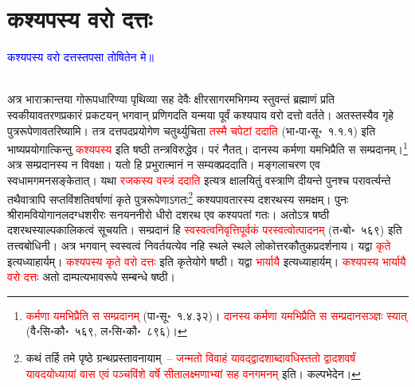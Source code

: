 \section[कश्यपस्य वरो दत्तः]{कश्यपस्य वरो दत्तः}
\centering\textcolor{blue}{कश्यपस्य वरो दत्तस्तपसा तोषितेन मे॥}\nopagebreak\\
\\
\begin{sloppypar}\justifying\noindent\hspace{10mm} अत्र भाराक्रान्तया गो\-रूप\-धारिण्या पृथिव्या सह देवैः क्षीर\-सागरमभिगम्य स्तुवन्तं ब्रह्माणं प्रति स्वकीयावतरण\-प्रकारं प्रकटयन् भगवान् प्रणिगदति यन्मया पूर्वं कश्यपाय वरो दत्तो वर्तते। अतस्तस्यैव गृहे पुत्र\-रूपेणावतरिष्यामि। तत्र दत्त\-पद\-प्रयोगेण चतुर्थ्युचिता \textcolor{red}{तस्मै चपेटां ददाति} (भा॰पा॰सू॰~१.१.१) इति भाष्य\-प्रयोगात्किन्तु \textcolor{red}{कश्यपस्य} इति षष्ठी तन्त्रविरुद्धेव। परं नैतत्। दानस्य कर्मणा यमभिप्रैति स सम्प्रदानम्।\footnote{\textcolor{red}{कर्मणा यमभिप्रैति स सम्प्रदानम्} (पा॰सू॰~१.४.३२)। \textcolor{red}{दानस्य कर्मणा यमभिप्रैति स सम्प्रदान\-सञ्ज्ञः स्यात्} (वै॰सि॰कौ॰~५६९, ल॰सि॰कौ॰~८९६)।} अत्र सम्प्रदानस्य न विवक्षा। यतो हि प्रभुरात्मानं न सम्यक्प्रददाति। मङ्गलाचरण एव स्व\-धाम\-गमन\-सङ्केतात्। यथा \textcolor{red}{रजकस्य वस्त्रं ददाति} इत्यत्र क्षालयितुं वस्त्राणि दीयन्ते पुनश्च परावर्त्यन्ते तथैवात्रापि सप्तविंशति\-वर्षाणां कृते पुत्र\-रूपेणाऽगतः\footnote{कथं तर्हि \pageref{text:exileage1}\-तमे पृष्ठे ग्रन्थ\-प्रस्तावनायाम्~– \textcolor{red}{जन्मतो विवाहं यावद्द्वादशाब्दावधिस्ततो द्वादश\-वर्षं यावदयोध्यायां वास एवं पञ्चविंशे वर्षे सीता\-लक्ष्मणाभ्यां सह वन\-गमनम्‌} इति। कल्पभेदेन।} कश्यपावतारस्य दशरथस्य समक्षम्। पुनः श्रीराम\-वियोगानल\-दग्ध\-शरीरः सनयन\-नीरो धीरो दशरथ एव कश्यपतां गतः। अतोऽत्र षष्ठी दशरथस्याल्प\-कालिकत्वं सूचयति। सम्प्रदानं हि \textcolor{red}{स्व\-स्वत्व\-निवृत्तिपूर्वकं पर\-स्वत्वोत्पादनम्‌} (त॰बो॰~५६९) इति तत्त्वबोधिनी। अत्र भगवान् स्व\-स्वत्वं निवर्तयत्येव नहि स्थले स्थले लोकोत्तर\-कौतुक\-प्रदर्शनाय। यद्वा \textcolor{red}{कृते} इत्यध्याहार्यम्। \textcolor{red}{कश्यपस्य कृते वरो दत्तः} इति कृते\-योगे षष्ठी।
यद्वा \textcolor{red}{भार्यायै} इत्यध्याहार्यम्। \textcolor{red}{कश्यपस्य भार्यायै वरो दत्तः} अतो दाम्पत्य\-भाव\-रूपे सम्बन्धे षष्ठी।\end{sloppypar}
